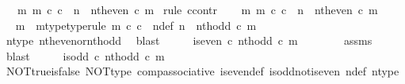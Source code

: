 \begin{isabellebody}
\ \ \ {\isachardoublequoteopen}{\isasymexists}m{\isachardot}{\kern0pt}\ m\ {\isasymin}\isactrlsub c\ {\isasymnat}\isactrlsub c\ {\isasymand}\ n\ {\isacharequal}{\kern0pt}\ nth{\isacharunderscore}{\kern0pt}even\ {\isasymcirc}\isactrlsub c\ m{\isachardoublequoteclose}\isanewline
%
\isadelimproof
%
\endisadelimproof
%
\isatagproof
{}\isamarkupfalse%
\ {\isacharparenleft}{\kern0pt}rule\ ccontr{\isacharparenright}{\kern0pt}\isanewline
\ \ \isamarkupfalse%
\ {\isachardoublequoteopen}{\isasymnexists}m{\isachardot}{\kern0pt}\ m\ {\isasymin}\isactrlsub c\ {\isasymnat}\isactrlsub c\ {\isasymand}\ n\ {\isacharequal}{\kern0pt}\ nth{\isacharunderscore}{\kern0pt}even\ {\isasymcirc}\isactrlsub c\ m{\isachardoublequoteclose}\isanewline
\ \ \isamarkupfalse%
\ \isamarkupfalse%
\ m\ \ m{\isacharunderscore}{\kern0pt}type{\isacharbrackleft}{\kern0pt}type{\isacharunderscore}{\kern0pt}rule{\isacharbrackright}{\kern0pt}{\isacharcolon}{\kern0pt}\ {\isachardoublequoteopen}m\ {\isasymin}\isactrlsub c\ {\isasymnat}\isactrlsub c{\isachardoublequoteclose}\ \ n{\isacharunderscore}{\kern0pt}def{\isacharcolon}{\kern0pt}\ {\isachardoublequoteopen}n\ {\isacharequal}{\kern0pt}\ nth{\isacharunderscore}{\kern0pt}odd\ {\isasymcirc}\isactrlsub c\ m{\isachardoublequoteclose}\isanewline
\ \ \ \ \isamarkupfalse%
\ n{\isacharunderscore}{\kern0pt}type\ nth{\isacharunderscore}{\kern0pt}even{\isacharunderscore}{\kern0pt}or{\isacharunderscore}{\kern0pt}nth{\isacharunderscore}{\kern0pt}odd\ \isamarkupfalse%
\ blast\isanewline
\ \ \isamarkupfalse%
\ \isamarkupfalse%
\ {\isachardoublequoteopen}is{\isacharunderscore}{\kern0pt}even\ {\isasymcirc}\isactrlsub c\ nth{\isacharunderscore}{\kern0pt}odd\ {\isasymcirc}\isactrlsub c\ m\ {\isacharequal}{\kern0pt}\ {\isasymt}{\isachardoublequoteclose}\isanewline
\ \ \ \ \isamarkupfalse%
\ assms{\isacharparenleft}{\kern0pt}{}{\isacharparenright}{\kern0pt}\ \isamarkupfalse%
\ blast\isanewline
\ \ \isamarkupfalse%
\ \isamarkupfalse%
\ {\isachardoublequoteopen}is{\isacharunderscore}{\kern0pt}odd\ {\isasymcirc}\isactrlsub c\ nth{\isacharunderscore}{\kern0pt}odd\ {\isasymcirc}\isactrlsub c\ m\ {\isacharequal}{\kern0pt}\ {\isasymf}{\isachardoublequoteclose}\isanewline
\ \ \ \ \isamarkupfalse%
\ NOT{\isacharunderscore}{\kern0pt}true{\isacharunderscore}{\kern0pt}is{\isacharunderscore}{\kern0pt}false\ NOT{\isacharunderscore}{\kern0pt}type\ comp{\isacharunderscore}{\kern0pt}associative{}\ is{\isacharunderscore}{\kern0pt}even{\isacharunderscore}{\kern0pt}def{}\ is{\isacharunderscore}{\kern0pt}odd{\isacharunderscore}{\kern0pt}not{\isacharunderscore}{\kern0pt}is{\isacharunderscore}{\kern0pt}even\ n{\isacharunderscore}{\kern0pt}def\ n{\isacharunderscore}{\kern0pt}type\ \isamarkupfalse%

\end{isabellebody}

